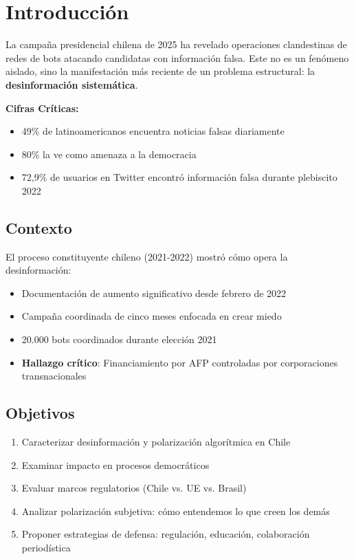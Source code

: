 
\hypertarget{sec1}{\section{Introducción}}\label{sec1}

La campaña presidencial chilena de 2025 ha revelado operaciones clandestinas de redes de bots atacando candidatas con información falsa. Este no es un fenómeno aislado, sino la manifestación más reciente de un problema estructural: la \textbf{desinformación sistemática}.

\begin{highlight}
\textbf{Cifras Críticas:}
\begin{itemize}
    \itemsep=0.12cm
    \item 49\% de latinoamericanos encuentra noticias falsas diariamente
    \item 80\% la ve como amenaza a la democracia
    \item 72,9\% de usuarios en Twitter encontró información falsa durante plebiscito 2022
\end{itemize}
\end{highlight}

\subsection{Contexto}

El proceso constituyente chileno (2021-2022) mostró cómo opera la desinformación:
\begin{itemize}
    \itemsep=0.1cm
    \item Documentación de aumento significativo desde febrero de 2022
    \item Campaña coordinada de cinco meses enfocada en crear miedo
    \item 20.000 bots coordinados durante elección 2021
    \item \textbf{Hallazgo crítico}: Financiamiento por AFP controladas por corporaciones transnacionales
\end{itemize}

\subsection{Objetivos}

\begin{enumerate}
    \itemsep=0.1cm
    \item Caracterizar desinformación y polarización algorítmica en Chile
    \item Examinar impacto en procesos democráticos
    \item Evaluar marcos regulatorios (Chile vs. UE vs. Brasil)
    \item Analizar polarización subjetiva: cómo entendemos lo que creen los demás
    \item Proponer estrategias de defensa: regulación, educación, colaboración periodística
\end{enumerate}
